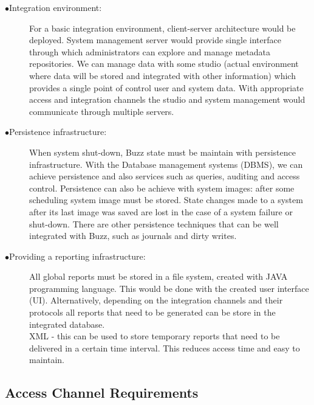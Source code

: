 \documentclass[12pt]{article}
\begin{document}
\begin{description}
\item[$\bullet$Integration environment:]

For a basic integration environment, client-server architecture would be deployed. System management server would provide single interface through which administrators can explore and manage metadata repositories. We can manage data with some studio (actual environment where data will be stored and integrated with other information) which provides a single point of control user and system data. With appropriate access and integration channels the studio and system management would communicate through multiple servers.\\

\item[$\bullet$Persistence infrastructure:]

When system shut-down, Buzz state must be maintain with persistence infrastructure. With the Database management systems (DBMS), we can achieve persistence and also services such as queries, auditing and access control. Persistence can also be achieve with system images: after some scheduling system image must be stored. State changes made to a system after its last image was saved are lost in the case of a system failure or shut-down. There are other persistence techniques that can be well integrated with Buzz, such as journals and dirty writes.\\

\item[$\bullet$Providing a reporting infrastructure:]

All global reports must be stored in a file system, created with JAVA programming language. This would be done with the created user interface (UI). Alternatively, depending on the integration channels and their protocols all reports that need to be generated can be store in the integrated database.\\

XML - this can be used to store temporary reports that need to be delivered in a certain time interval. This reduces access time and easy to maintain.\\

\end{description}



\subsection{Access Channel Requirements}
\end{document}
